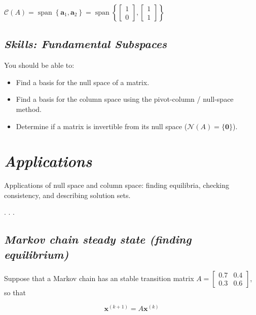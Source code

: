 \documentclass[
  letterpaper,
  DIV=11,
  numbers=noendperiod]{scrartcl}
\providecommand{\tightlist}{%
  \setlength{\itemsep}{0pt}\setlength{\parskip}{0pt}}\usepackage{longtable,booktabs,array}
\begin{document}
\(\mathcal{C}(A)=\operatorname{span}\left\{\mathbf{a}_{1}, \mathbf{a}_{2}\right\}=\operatorname{span}\left\{\left[\begin{array}{l}1 \\ 0\end{array}\right],\left[\begin{array}{l}1 \\ 1\end{array}\right]\right\}\)

\subsection{\texorpdfstring{\emph{Skills: Fundamental
Subspaces}}{Skills: Fundamental Subspaces}}\label{skills-fundamental-subspaces}

You should be able to:

\begin{itemize}
\tightlist
\item
  Find a basis for the null space of a matrix.
\item
  Find a basis for the column space using the pivot-column / null-space
  method.
\item
  Determine if a matrix is invertible from its null space
  (\(\mathcal{N}(A)=\{\mathbf{0}\}\)).
\end{itemize}

\section{\texorpdfstring{\emph{Applications}}{Applications}}\label{applications}

Applications of null space and column space: finding equilibria,
checking consistency, and describing solution sets.

. . .

\subsection{\texorpdfstring{\emph{Markov chain steady state (finding
equilibrium)}}{Markov chain steady state (finding equilibrium)}}\label{markov-chain-steady-state-finding-equilibrium}

Suppose that a Markov chain has an stable transition matrix
\(A=\left[\begin{array}{ll}0.7 & 0.4 \\ 0.3 & 0.6\end{array}\right]\),
so that

\[
\mathbf{x}^{(k+1)}=A \mathbf{x}^{(k)}
\]
\end{document}

